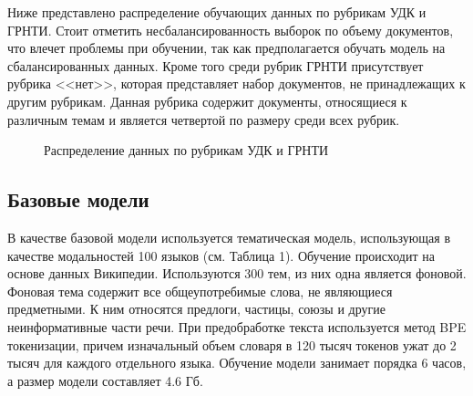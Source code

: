 \documentclass[12pt, twoside]{article}
\begin{document}
Ниже представлено распределение обучающих данных по рубрикам УДК и ГРНТИ. Стоит отметить несбалансированность выборок по объему документов, что влечет проблемы при обучении, так как предполагается обучать модель на сбалансированных данных. Кроме того среди рубрик ГРНТИ присутствует рубрика <<нет>>, которая представляет набор документов, не принадлежащих к другим рубрикам. Данная рубрика содержит документы, относящиеся к различным темам и является четвертой по размеру среди всех рубрик.

\begin{figure}[H]
 \caption{Распределение данных по рубрикам УДК и ГРНТИ}
  \label{fig:1}
\end{figure}

\subsection{Базовые модели}

В качестве базовой модели используется тематическая модель, использующая в качестве модальностей 100 языков (см. Таблица 1). Обучение происходит на основе данных Википедии. Используются 300 тем, из них одна является фоновой. Фоновая тема содержит все общеупотребимые слова, не являющиеся предметными. К ним относятся предлоги, частицы, союзы и другие неинформативные части речи. При предобработке текста используется метод BPE токенизации, причем изначальный объем словаря в 120 тысяч токенов ужат до 2 тысяч для каждого отдельного языка. Обучение модели занимает порядка 6 часов, а размер модели составляет 4.6 Гб. 
\end{document}
